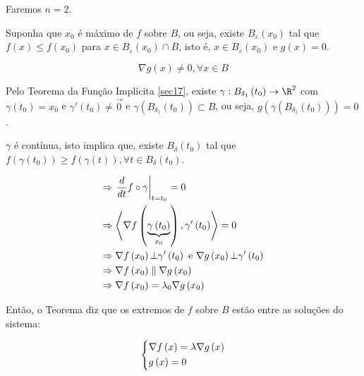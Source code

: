 \documentclass{book}
\begin{document}
\begin{dem}
Faremos $n = 2$.

    Suponha que $x_0$ \'e m\'aximo de $f$ sobre $B$, ou seja, existe $B_\varepsilon  \left( {x_0 } \right)$ tal que $f\left( x \right) \leqslant f\left( {x_0 } \right)$ para $x \in B_\varepsilon  \left( {x_0 } \right) \cap B$, isto \'e, $x \in B_\varepsilon  \left( {x_0 } \right)$ e $g(x) = 0$.

\[
\nabla g\left( x \right) \ne 0,\forall x \in B
\]

    Pelo Teorema da Fun\c c\~ao Impl\'icita \ref{sec17}, existe $\gamma :B_{\delta _1 } \left( {t_0 } \right) \to \R^2$ com $\gamma \left( {t_0 } \right) = x_0$ e $\gamma '\left( {t_0 } \right) \ne \overrightarrow 0$ e $\gamma \left( {B_{\delta _1 } \left( {t_0 } \right)} \right) \subset B$, ou seja, $g\left( {\gamma \left( {B_{\delta _1 } \left( {t_0 } \right)} \right)} \right) = 0$.

    $\gamma$ \'e cont\'inua, isto implica que, existe $B_\delta  \left( {t_0 } \right)$ tal que $f\left( {\gamma \left( {t_0 } \right)} \right) \geqslant f\left( {\gamma \left( t \right)} \right),\forall t \in B_\delta  \left( {t_0 } \right)$.

\[
\begin{gathered}
\Rightarrow \left. {\frac{d}
{{dt}}f \circ \gamma } \right|_{t = t_0 }  = 0 \hfill \\
   \Rightarrow \left\langle {\nabla f\left( {\underbrace {\gamma \left( {t_0 } \right)}_{x_0 }} \right),\gamma '\left( {t_0 } \right)} \right\rangle  = 0 \hfill \\
   \Rightarrow \nabla f\left( {x_0 } \right) \bot \gamma '\left( {t_0 } \right){\text{ e }}\nabla g\left( {x_0 } \right) \bot \gamma '\left( {t_0 } \right) \hfill \\
   \Rightarrow \nabla f\left( {x_0 } \right)\parallel \nabla g\left( {x_0 } \right) \hfill \\
   \Rightarrow \nabla f\left( {x_0 } \right) = \lambda _0 \nabla g\left( {x_0 } \right) \hfill \\
\end{gathered}
\]

\end{dem}


Ent\~ao, o Teorema diz que os extremos de $f$ sobre $B$ est\~ao entre as solu\c c\~oes do sistema:

\[
\left\{ \begin{gathered}
\nabla f\left( x \right) = \lambda \nabla g\left( x \right) \hfill \\
g\left( x \right) = 0 \hfill \\
\end{gathered}  \right.
\]
\end{document}
